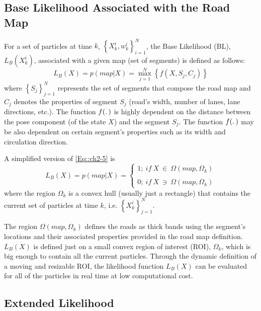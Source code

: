 \subsection{Base Likelihood Associated with the Road Map}

For a set of particles at time $k$, $\left\lbrace X_{k}^{i},w_{k}^{i} \right\rbrace _{i=1}^N$, the Base Likelihood (BL), $L_B\left(X_{k}^{i} \right)$, associated with a given map (set of segments) is defined as follows:
\begin{equation}
\label{Eq::ch2-5}
L_B\left(X\right) =p\left( map | X\right) = \max_{j=1}^{N}\left\lbrace f\left( X,S_j,C_j \right) \right\rbrace 
\end{equation}
where $\left\lbrace  S_j \right\rbrace_{j=1}^N$ represents the set of segments that compose the road map and $C_j$ denotes the properties of segment $S_j$ (road's width, number of lanes, lane directions, etc.). The function $f(\ldotp)$ is highly dependent on the distance between the pose component (of the state $X$) and the segment $S_j$. The function $f(\ldotp)$ may be also dependent on certain segment's properties such as its width and circulation direction.

A simplified version of \ref{Eq::ch2-5} is
\begin{equation}
	\label{Eq::ch2-6}
	L_B\left(X\right) =	p\left( map | X\right) = \left \{
		\begin{array}{l}
			1;\ if\ X\ \in\ \Omega(map,\Omega_k)\\\\
			0;\ if\ X\ \ni\ \Omega(map,\Omega_k)
\end{array}
\right.
\end{equation}
where the region $\Omega_k$ is a convex hull (usually just a rectangle) that contains the current set of particles at time $k$, i.e. $\left\lbrace  X_k^i \right\rbrace_{j=1}^N$.

The region $\Omega(map,\Omega_k)$ defines the roads as thick bands using the segment's locations and their associated properties provided in the road map definition. $L_B(X)$  is defined just on a small convex region of interest (ROI), $\Omega_k$, which is big enough to contain all the current particles. Through the dynamic definition of a moving and resizable ROI, the likelihood function $L_B(X)$ can be evaluated for all of the particles in real time at low computational cost.

\subsection{Extended Likelihood}


